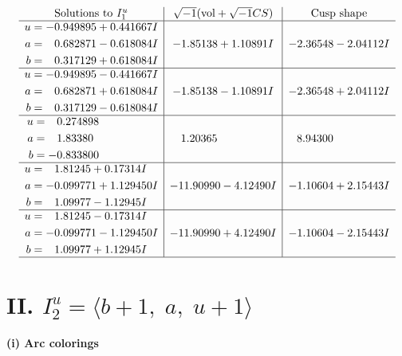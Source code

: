 \documentclass[1p]{elsarticle_modified}
\theoremstyle{definition}
\newcommand{\I}{\sqrt{-1}}
\begin{document}
$$\begin{array}{c|c|c}  
\text{Solutions to }I^u_{1}& \I (\text{vol} + \sqrt{-1}CS) & \text{Cusp shape}\\
 \hline 
\begin{aligned}
u &= -0.949895 + 0.441667 I \\
a &= \phantom{-}0.682871 - 0.618084 I \\
b &= \phantom{-}0.317129 + 0.618084 I\end{aligned}
 & -1.85138 + 1.10891 I & -2.36548 - 2.04112 I \\ \hline\begin{aligned}
u &= -0.949895 - 0.441667 I \\
a &= \phantom{-}0.682871 + 0.618084 I \\
b &= \phantom{-}0.317129 - 0.618084 I\end{aligned}
 & -1.85138 - 1.10891 I & -2.36548 + 2.04112 I \\ \hline\begin{aligned}
u &= \phantom{-}0.274898\phantom{ +0.000000I} \\
a &= \phantom{-}1.83380\phantom{ +0.000000I} \\
b &= -0.833800\phantom{ +0.000000I}\end{aligned}
 & \phantom{-}1.20365\phantom{ +0.000000I} & \phantom{-}8.94300\phantom{ +0.000000I} \\ \hline\begin{aligned}
u &= \phantom{-}1.81245 + 0.17314 I \\
a &= -0.099771 + 1.129450 I \\
b &= \phantom{-}1.09977 - 1.12945 I\end{aligned}
 & -11.90990 - 4.12490 I & -1.10604 + 2.15443 I \\ \hline\begin{aligned}
u &= \phantom{-}1.81245 - 0.17314 I \\
a &= -0.099771 - 1.129450 I \\
b &= \phantom{-}1.09977 + 1.12945 I\end{aligned}
 & -11.90990 + 4.12490 I & -1.10604 - 2.15443 I\\
 \hline 
 \end{array}$$\newpage\newpage\renewcommand{\arraystretch}{1}
\centering \section*{II. $I^u_{2}= \langle b+1,\;a,\;u+1 \rangle$}
\flushleft \textbf{(i) Arc colorings}\\
\end{document}
